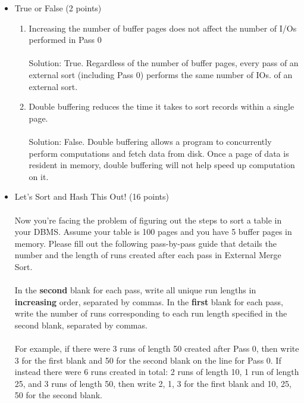 \documentclass[10pt]{article}
\begin{document}
\begin{itemize}
    \item True or False (2 points)
    \begin{enumerate}
        \item  Increasing the number of buffer pages does not affect the number of I/Os performed in Pass 0\\
        \\
        {\color{red}Solution: True. Regardless of the number of buffer pages, every pass of an external sort (including Pass 0) performs the same number of IOs.
of an external sort.\\}
        \item Double buffering reduces the time it takes to sort records within a single page.\\
        \\
        {\color{red}Solution: False. Double buffering allows a program to concurrently perform computations and fetch data from disk. Once a page of data is resident in memory, double buffering will not help speed up computation on it.}
    \end{enumerate}
    \quad\par \quad\par 
    \item Let’s Sort and Hash This Out! (16 points)
    \\
    \\
    Now you're facing the problem of figuring out the steps to sort a table in your DBMS. Assume your table is 100 pages and you have 5 buffer pages in memory. Please fill out the following pass-by-pass guide that details the number and the length of runs created after each pass in External Merge Sort.
    \\
    \\
    In the \textbf{second} blank for each pass, write all unique run lengths in \textbf{increasing} order, separated by commas. In the \textbf{first} blank for each pass, write the number of runs corresponding to each run length specified in the
second blank, separated by commas.\\ \\
For example, if there were 3 runs of length 50 created after Pass 0, then write 3 for the first blank and 50
for the second blank on the line for Pass 0.
If instead there were 6 runs created in total: 2 runs of length 10, 1 run of length 25, and 3 runs of length
50, then write 2, 1, 3 for the first blank and 10, 25, 50 for the second blank. \\ \\

\end{itemize}
\end{document}
